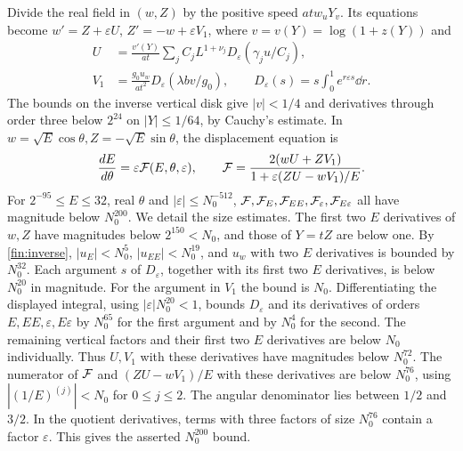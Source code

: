 Divide the real field in \((w,Z)\) by the positive speed
\(at w_uY_v\). Its equations become \(w'=Z+\varepsilon U\),
\(Z'=-w+\varepsilon V_1\), where \(v=v(Y)=\log(1+z(Y))\) and
\begin{align*}
 U&=\frac{v'(Y)}{at}\sum_j C_j L^{1+\nu_j}
                    D_\varepsilon(\gamma_j u/C_j),\\
 V_1&=\frac{g_0 u_w}{at^2}D_\varepsilon(\lambda b v/g_0),\qquad
 D_\varepsilon(s)=s\int_0^1e^{r\varepsilon s}\dd r .
\end{align*}
The bounds on the inverse vertical disk give \(|v|<1/4\) and derivatives
through order three below \(2^{24}\) on \(|Y|\le1/64\), by Cauchy's estimate.
In \(w=\sqrt E\cos\theta, Z=-\sqrt E\sin\theta\), the displacement equation is
\begin{equation}
 \frac{dE}{d\theta}=\varepsilon\mathcal F(E,\theta,\varepsilon),\qquad
 \mathcal F=\frac{2(wU+ZV_1)}{1+\varepsilon(ZU-wV_1)/E}.                    \label{fin:radial}
\end{equation}
For \(2^{-95}\le E\le32\), real \(\theta\) and \(|\varepsilon|\le N_0^{-512}\),
\(\mathcal F,\mathcal F_E,\mathcal F_{EE},\mathcal F_\varepsilon,\mathcal F_{E\varepsilon}\) all have magnitude
below \(N_0^{200}\). We detail the size estimates. The first two \(E\) derivatives
of \(w,Z\) have magnitudes below \(2^{150}<N_0\), and those of \(Y=tZ\)
are below one. By \eqref{fin:inverse}, \(|u_E|<N_0^5\), \(|u_{EE}|<N_0^{19}\),
and \(u_w\) with two \(E\) derivatives is bounded by \(N_0^{32}\).
Each argument \(s\) of \(D_\varepsilon\), together with its first two
\(E\) derivatives, is below \(N_0^{20}\) in magnitude. For the argument in
\(V_1\) the bound is \(N_0\). Differentiating the displayed integral, using
\(|\varepsilon|N_0^{20}<1\), bounds \(D_\varepsilon\) and its derivatives of
orders \(E,EE,\varepsilon,E\varepsilon\) by \(N_0^{65}\) for the first
argument and by \(N_0^4\) for the second. The remaining vertical factors and
their first two \(E\) derivatives are below \(N_0\) individually.
Thus \(U,V_1\) with these derivatives have magnitudes below \(N_0^{72}\).
The numerator of \(\mathcal F\) and \((ZU-wV_1)/E\) with these derivatives are below
\(N_0^{76}\), using \(|(1/E)^{(j)}|<N_0\) for \(0\le j\le2\).
The angular denominator lies between \(1/2\) and \(3/2\). In the quotient
derivatives, terms with three factors of size \(N_0^{76}\) contain a factor
\(\varepsilon\). This gives the asserted \(N_0^{200}\) bound.

